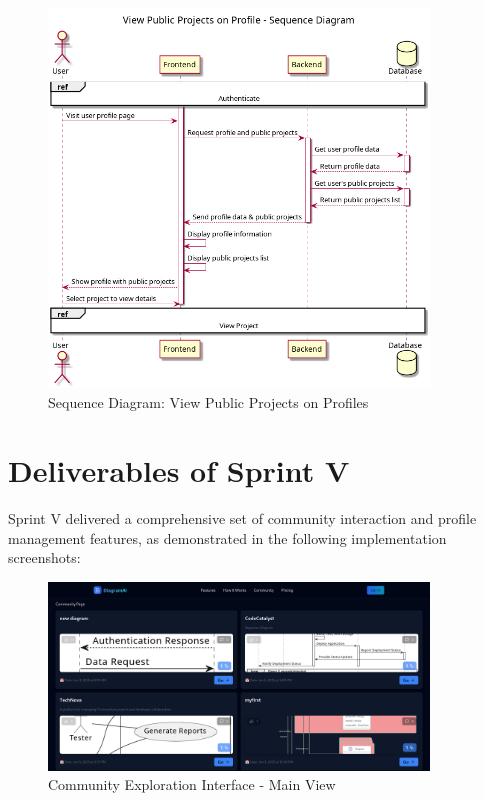 \begin{figure}[H]
\centering
\includegraphics[width=0.9\textwidth]{conception/SprintV/sequence_diagrams/sequence_profileManagement_7_2_ViewPublicProjectsOnProfiles.png}
\caption{Sequence Diagram: View Public Projects on Profiles}
\label{fig:seq_view_public_projects}
\end{figure}

\section{Deliverables of Sprint V}

Sprint V delivered a comprehensive set of community interaction and profile management features, as demonstrated in the following implementation screenshots:

\begin{figure}[H]
\centering
\includegraphics[width=0.9\textwidth]{screenshots/community1.png}
\caption{Community Exploration Interface - Main View}
\label{fig:community_main}
\end{figure}

